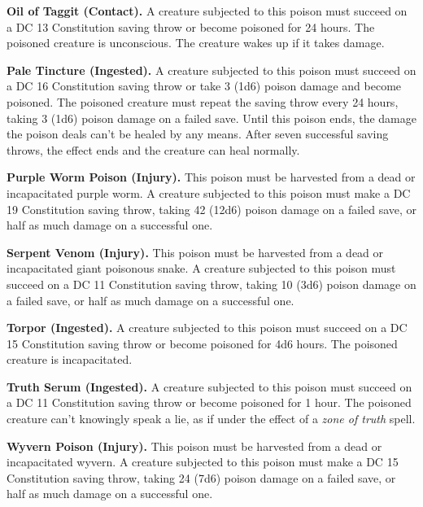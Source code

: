 \documentclass[
]{article}
\begin{document}
\textbf{Oil of Taggit (Contact).} A creature subjected to this poison
must succeed on a DC 13 Constitution saving throw or become poisoned for
24 hours. The poisoned creature is unconscious. The creature wakes up if
it takes damage.

\textbf{Pale Tincture (Ingested).} A creature subjected to this poison
must succeed on a DC 16 Constitution saving throw or take 3 (1d6) poison
damage and become poisoned. The poisoned creature must repeat the saving
throw every 24 hours, taking 3 (1d6) poison damage on a failed save.
Until this poison ends, the damage the poison deals can't be healed by
any means. After seven successful saving throws, the effect ends and the
creature can heal normally.

\textbf{Purple Worm Poison (Injury).} This poison must be harvested from
a dead or incapacitated purple worm. A creature subjected to this poison
must make a DC 19 Constitution saving throw, taking 42 (12d6) poison
damage on a failed save, or half as much damage on a successful one.

\textbf{Serpent Venom (Injury).} This poison must be harvested from a
dead or incapacitated giant poisonous snake. A creature subjected to
this poison must succeed on a DC 11 Constitution saving throw, taking 10
(3d6) poison damage on a failed save, or half as much damage on a
successful one.

\textbf{Torpor (Ingested).} A creature subjected to this poison must
succeed on a DC 15 Constitution saving throw or become poisoned for 4d6
hours. The poisoned creature is incapacitated.

\textbf{Truth Serum (Ingested).} A creature subjected to this poison
must succeed on a DC 11 Constitution saving throw or become poisoned for
1 hour. The poisoned creature can't knowingly speak a lie, as if under
the effect of a \emph{zone of truth} spell.

\textbf{Wyvern Poison (Injury).} This poison must be harvested from a
dead or incapacitated wyvern. A creature subjected to this poison must
make a DC 15 Constitution saving throw, taking 24 (7d6) poison damage on
a failed save, or half as much damage on a successful one.
\end{document}
